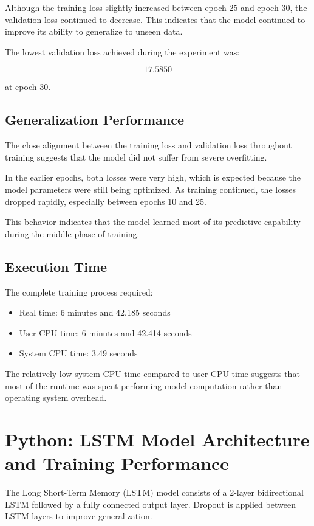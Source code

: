 \documentclass[12pt]{article}
\begin{document}
Although the training loss slightly increased between epoch 25 and epoch 30, the validation loss continued to decrease. This indicates that the model continued to improve its ability to generalize to unseen data.

The lowest validation loss achieved during the experiment was:

\[
17.5850
\]

at epoch 30.

\subsection{Generalization Performance}

The close alignment between the training loss and validation loss throughout training suggests that the model did not suffer from severe overfitting.

In the earlier epochs, both losses were very high, which is expected because the model parameters were still being optimized. As training continued, the losses dropped rapidly, especially between epochs 10 and 25.

This behavior indicates that the model learned most of its predictive capability during the middle phase of training.

\subsection{Execution Time}

The complete training process required:

\begin{itemize}
    \item Real time: 6 minutes and 42.185 seconds
    \item User CPU time: 6 minutes and 42.414 seconds
    \item System CPU time: 3.49 seconds
\end{itemize}

The relatively low system CPU time compared to user CPU time suggests that most of the runtime was spent performing model computation rather than operating system overhead.
\section{Python: LSTM Model Architecture and Training Performance}

The Long Short-Term Memory (LSTM) model consists of a 2-layer bidirectional LSTM followed by a fully connected output layer. Dropout is applied between LSTM layers to improve generalization.
\end{document}
